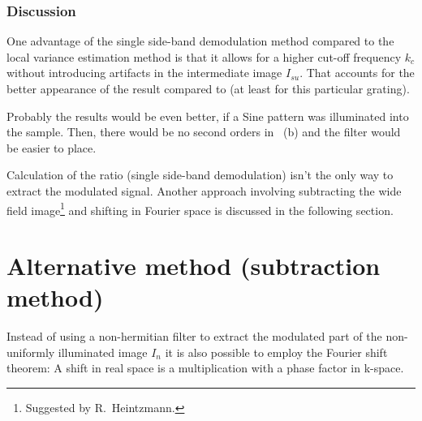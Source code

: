 \subsubsection*{Discussion}
One advantage of the single side-band demodulation method compared to
the local variance estimation method is that it allows for a higher
cut-off frequency $k_c$ without introducing artifacts in the
intermediate image $I_{su}$. That accounts for the better appearance
of the result  compared to  (at
least for this particular grating).

Probably the results would be even better, if a Sine pattern was
illuminated into the sample. Then, there would be no second orders in
~(b) and the filter would be easier to place.

Calculation of the ratio (single side-band demodulation) isn't the
only way to extract the modulated signal. Another approach involving
subtracting the wide field image\footnote{Suggested by R.~Heintzmann.}
and shifting in Fourier space is discussed in the following section.
\section{Alternative method (subtraction method)}
Instead of using a non-hermitian filter to extract the modulated part
of the non-uniformly illuminated image $I_n$ it is also possible to
employ the Fourier shift theorem: A shift in real space is 
a multiplication with a phase factor in k-space. 

